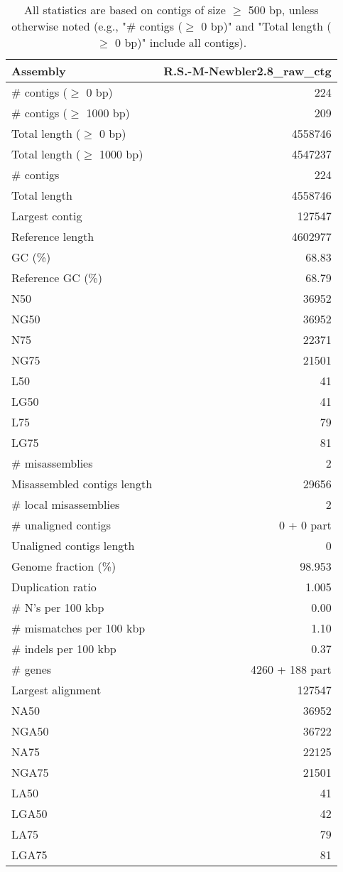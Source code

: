 \documentclass[12pt,a4paper]{article}
\begin{document}
\begin{table}[ht]
\begin{center}
\caption{All statistics are based on contigs of size $\geq$ 500 bp, unless otherwise noted (e.g., "\# contigs ($\geq$ 0 bp)" and "Total length ($\geq$ 0 bp)" include all contigs).}
\begin{tabular}{|l*{1}{|r}|}
\hline
Assembly & R.S.-M-Newbler2.8\_raw\_ctg \\ \hline
\# contigs ($\geq$ 0 bp) & 224 \\ \hline
\# contigs ($\geq$ 1000 bp) & 209 \\ \hline
Total length ($\geq$ 0 bp) & 4558746 \\ \hline
Total length ($\geq$ 1000 bp) & 4547237 \\ \hline
\# contigs & 224 \\ \hline
Total length & 4558746 \\ \hline
Largest contig & 127547 \\ \hline
Reference length & 4602977 \\ \hline
GC (\%) & 68.83 \\ \hline
Reference GC (\%) & 68.79 \\ \hline
N50 & 36952 \\ \hline
NG50 & 36952 \\ \hline
N75 & 22371 \\ \hline
NG75 & 21501 \\ \hline
L50 & 41 \\ \hline
LG50 & 41 \\ \hline
L75 & 79 \\ \hline
LG75 & 81 \\ \hline
\# misassemblies & 2 \\ \hline
Misassembled contigs length & 29656 \\ \hline
\# local misassemblies & 2 \\ \hline
\# unaligned contigs & 0 + 0 part \\ \hline
Unaligned contigs length & 0 \\ \hline
Genome fraction (\%) & 98.953 \\ \hline
Duplication ratio & 1.005 \\ \hline
\# N's per 100 kbp & 0.00 \\ \hline
\# mismatches per 100 kbp & 1.10 \\ \hline
\# indels per 100 kbp & 0.37 \\ \hline
\# genes & 4260 + 188 part \\ \hline
Largest alignment & 127547 \\ \hline
NA50 & 36952 \\ \hline
NGA50 & 36722 \\ \hline
NA75 & 22125 \\ \hline
NGA75 & 21501 \\ \hline
LA50 & 41 \\ \hline
LGA50 & 42 \\ \hline
LA75 & 79 \\ \hline
LGA75 & 81 \\ \hline
\end{tabular}
\end{center}
\end{table}
\end{document}
